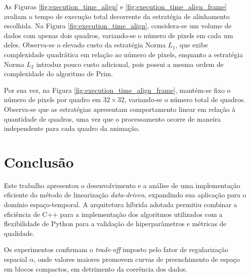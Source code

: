 \documentclass[12pt]{article}
\begin{document}
As Figuras \ref{fig:execution_time_align} e \ref{fig:execution_time_align_frame} avaliam o tempo de execução total
decorrente da estratégia de alinhamento escolhida. Na Figura \ref{fig:execution_time_align},
considera-se um volume de dados com apenas dois quadros, variando-se o número de pixels em cada um deles.
Observa-se o elevado custo da estratégia Norma $L_1$, que exibe complexidade quadrática em relação ao
número de pixels, enquanto a estratégia Norma $L_2$ introduz pouco custo adicional, pois possui a mesma
ordem de complexidade do algoritmo de Prim.


Por sua vez, na Figura \ref{fig:execution_time_align_frame}, mantém-se fixo o número de pixels por quadro em
$32 \times 32$, variando-se o número total de quadros. Observa-se que as estratégias apresentam comportamento
linear em relação à quantidade de quadros, uma vez que o processamento ocorre de maneira independente para
cada quadro da animação.

\FloatBarrier
\section{Conclusão}


Este trabalho apresentou o desenvolvimento e a análise de uma implementação eficiente do método de
linearização \textit{data-driven}, expandindo sua aplicação para o domínio espaço-temporal. A arquitetura
híbrida adotada permitiu combinar a eficiência de C++ para a implementação dos algoritmos utilizados com a
flexibilidade de Python para a validação de hiperparâmetros e métricas de qualidade.

Os experimentos confirmam o \textit{trade-off} imposto pelo fator de regularização espacial
$\alpha$, onde valores maiores promovem curvas de preenchimento de espaço em blocos compactos, em detrimento da
coerência dos dados.
\end{document}
